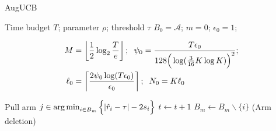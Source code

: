 \begin{algorithm}[t!]
\caption{AugUCB}
\label{alg:augucb}
\begin{algorithmic}
 Time budget $T$; parameter $\rho$; 
  threshold $\tau$
 $B_{0}=\mathcal{A}$; $m=0$; $\epsilon_{0}=1$;
\begin{small}
\begin{align*}
M&=\left\lfloor \frac{1}{2}\log_{2} \frac{T}{e}\right\rfloor; 
\hspace{2mm}\psi_{0}=\frac{T\epsilon_{0}}{128\Big(\log(\frac{3}{16}K\log K)\Big)^2}; \\
\ell_{0}&=\left\lceil \frac{2\psi_0\log( T\epsilon_{0})}{\epsilon_{0}} \right\rceil;
\hspace{2mm}N_{0}=K\ell_{0}
\end{align*}
\end{small}
\vspace{-5mm}
\State {}
\State Pull arm $j\in\operatorname*{arg\,min}_{i\in B_{m}}\Big\lbrace |\hat{r}_{i} - \tau | - 2s_{i}\Big\rbrace$
\State $t\leftarrow t+1$ 
\vspace{-4mm}
\State {}
\vspace{-4mm}
\State {}
\State $B_m\leftarrow B_m\backslash\{i\}$\hspace{4mm} (Arm deletion)
\EndIf
\EndFor

\end{algorithmic}
\end{algorithm}
